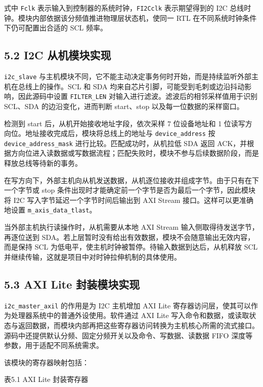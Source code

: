 式中 \texttt{Fclk} 表示输入到控制器的系统时钟，\texttt{FI2Cclk}
表示期望得到的 I2C
总线时钟。模块内部依据该分频值推进物理层状态机，使同一 RTL
在不同系统时钟条件下仍可配置出合适的 SCL 频率。

\subsection{5.2 I2C
从机模块实现}\label{i2c-ux4eceux673aux6a21ux5757ux5b9eux73b0}

\texttt{i2c\_slave}
与主机模块不同，它不能主动决定事务何时开始，而是持续监听外部主机在总线上的操作。SCL
和 SDA 均来自芯片引脚，可能受到毛刺或边沿抖动影响，因此源码中设置
\texttt{FILTER\_LEN} 对输入进行滤波。滤波后的相邻采样值用于识别 SCL、SDA
的边沿变化，进而判断 start、stop 以及每一位数据的采样窗口。

检测到 start 后，从机开始接收地址字段，依次采样 7 位设备地址和 1
位读写方向位。地址接收完成后，模块将总线上的地址与
\texttt{device\_address} 按 \texttt{device\_address\_mask}
进行比较。匹配成功时，从机拉低 SDA 返回
ACK，并根据方向位进入读数据或写数据流程；匹配失败时，模块不参与后续数据阶段，而是释放总线等待新的事务。

在写方向下，外部主机向从机发送数据，从机逐位接收并组成字节。由于只有在下一个字节或
stop 条件出现时才能确定前一个字节是否为最后一个字节，因此模块将 I2C
写入字节延迟一个字节时间后输出到 AXI Stream 接口。这样可以更准确地设置
\texttt{m\_axis\_data\_tlast}。

当外部主机执行读操作时，从机需要从本地 AXI Stream
输入侧取得待发送字节，再逐位送到
SDA。若上层暂时没有给出有效数据，模块不会随意输出无效内容，而是保持 SCL
为低电平，使主机时钟被暂停。待输入数据到达后，从机释放 SCL
并继续传输，这就是项目中对时钟拉伸机制的具体使用。

\subsection{5.3 AXI Lite
封装模块实现}\label{axi-lite-ux5c01ux88c5ux6a21ux5757ux5b9eux73b0}

\texttt{i2c\_master\_axil} 的作用是为 I2C 主机增加 AXI Lite
寄存器访问层，使其可以作为处理器系统中的普通外设使用。软件通过 AXI Lite
写入命令和数据，或读取状态与返回数据，而模块内部再把这些寄存器访问转换为主机核心所需的流式接口。源码中还提供默认分频、固定分频开关以及命令、写数据、读数据
FIFO 深度等参数，用于适配不同系统需求。

该模块的寄存器映射包括：

表5.1 AXI Lite 封装寄存器

